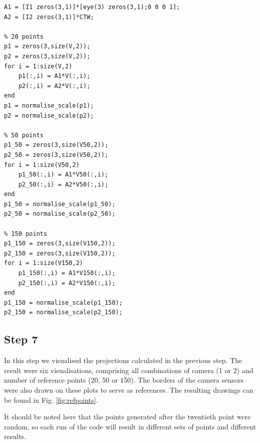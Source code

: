 \documentclass[peerreview,11pt]{IEEEtran}
\begin{document}
\begin{verbatim}
A1 = [I1 zeros(3,1)]*[eye(3) zeros(3,1);0 0 0 1];
A2 = [I2 zeros(3,1)]*CTW;

% 20 points
p1 = zeros(3,size(V,2));
p2 = zeros(3,size(V,2));
for i = 1:size(V,2)
    p1(:,i) = A1*V(:,i);
    p2(:,i) = A2*V(:,i);
end
p1 = normalise_scale(p1);
p2 = normalise_scale(p2);

% 50 points
p1_50 = zeros(3,size(V50,2));
p2_50 = zeros(3,size(V50,2));
for i = 1:size(V50,2)
    p1_50(:,i) = A1*V50(:,i);
    p2_50(:,i) = A2*V50(:,i);
end
p1_50 = normalise_scale(p1_50);
p2_50 = normalise_scale(p2_50);

% 150 points
p1_150 = zeros(3,size(V150,2));
p2_150 = zeros(3,size(V150,2));
for i = 1:size(V150,2)
    p1_150(:,i) = A1*V150(:,i);
    p2_150(:,i) = A2*V150(:,i);
end
p1_150 = normalise_scale(p1_150);
p2_150 = normalise_scale(p2_150);
\end{verbatim}

\subsection{Step 7}

In this step we visualised the projections calculated in the previous step. The result were six visualisations, comprising all combinations of camera (1 or 2) and number of reference points (20, 50 or 150). The borders of the camera sensors were also drawn on these plots to serve as references. The resulting drawings can be found in Fig. \ref{fig:refpoints}.

It should be noted here that the points generated after the twentieth point were random, so each run of the code will result in different sets of points and different results.
\end{document}
